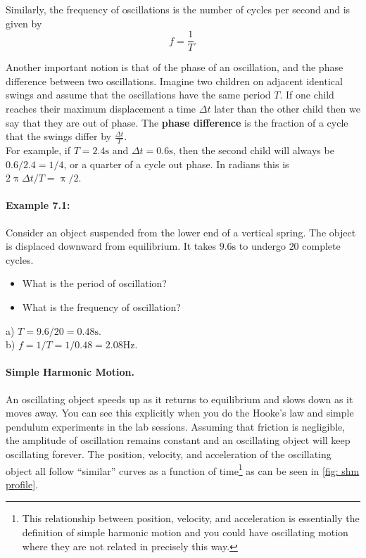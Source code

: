 Similarly, the frequency of oscillations is the number of cycles per second and is given by
\begin{equation*}
f=\frac{1}{T}.
\end{equation*}

Another important notion is that of the phase of an oscillation, and the phase difference between two oscillations. Imagine two children on adjacent identical swings and assume that the oscillations have the same period $T$. If one child reaches their maximum displacement a time $\Delta t$ later than the other child then we say that they are out of phase. The \textbf{phase difference} is the fraction of a cycle that the swings differ by $\frac{\Delta t}{T}$.\\

For example, if $T=2.4\text{s}$ and $\Delta t=0.6\text{s}$, then the second child will always be $0.6/2.4=1/4$, or a quarter of a cycle out phase. In radians this is $2\uppi\Delta t/T=\uppi/2$.

\paragraph{Example 7.1:}Consider an object suspended from the lower end of a vertical spring. The object is displaced downward from equilibrium. It takes $9.6\text{s}$ to undergo $20$ complete cycles.
\begin{itemize}
\setlength{\itemsep}{-5pt}
    \item[a)] What is the period of oscillation?
    \item[b)] What is the frequency of oscillation?
\end{itemize}  
a) $T=9.6/20=0.48\text{s}$.\\

b) $f=1/T=1/0.48=2.08\text{Hz}$.\\


\paragraph{Simple Harmonic Motion.} An oscillating object speeds up as it returns to equilibrium and slows down as it moves away. You can see this explicitly when you do the Hooke's law and simple pendulum experiments in the lab sessions. Assuming that friction is negligible, the amplitude of oscillation remains constant and an oscillating object will keep oscillating forever. The position, velocity, and acceleration of the oscillating object all follow ``similar'' curves as a function of time\footnote{This relationship between position, velocity, and acceleration is essentially the definition of simple harmonic motion and you could have oscillating motion where they are not related in precisely this way.} as can be seen in \cref{fig: shm profile}.

